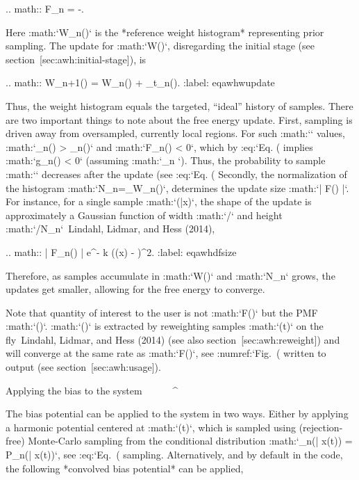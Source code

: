 .. math:: \Delta F_n = -\ln {}.

Here :math:`W_n(\lambda)` is the *reference weight histogram*
representing prior sampling. The update for :math:`W(\lambda)`,
disregarding the initial stage (see section [sec:awh:initial-stage]), is

.. math:: W_{n+1}(\lambda) = W_n(\lambda) + \sum_t\rho_n(\lambda).
          :label: eqawhwupdate

Thus, the weight histogram equals the targeted, “ideal” history of
samples. There are two important things to note about the free energy
update. First, sampling is driven away from oversampled, currently local
regions. For such :math:`\lambda` values,
:math:`\omega_n(\lambda) > \rho_n(\lambda)` and
:math:`\Delta F_n(\lambda) < 0`, which by :eq:`Eq. (%
implies :math:`\Delta g_n(\lambda) < 0` (assuming
:math:`\Delta \rho_n `). Thus, the probability to sample
:math:`\lambda` decreases after the update (see :eq:`Eq. (%
Secondly, the normalization of the histogram
:math:`N_n=\sum_\lambda W_n(\lambda)`, determines the update size
:math:`| \Delta F(\lambda) |`. For instance, for a single sample
:math:`\omega(\lambda|x)`, the shape of the update is approximately a
Gaussian function of width :math:`/` and height
:math:`/N_n` Lindahl, Lidmar, and Hess (2014),

.. math:: | \Delta F_n(\lambda) | \propto {} e^{- \beta k (\xi(x) - \lambda)^2}.
          :label: eqawhdfsize

Therefore, as samples accumulate in :math:`W(\lambda)` and :math:`N_n`
grows, the updates get smaller, allowing for the free energy to
converge.

Note that quantity of interest to the user is not :math:`F(\lambda)` but
the PMF :math:`\Phi(\xi)`. :math:`\Phi(\xi)` is extracted by reweighting
samples :math:`\xi(t)` on the fly Lindahl, Lidmar, and Hess (2014) (see
also section [sec:awh:reweight]) and will converge at the same rate as
:math:`F(\lambda)`, see :numref:`Fig. (%
written to output (see section [sec:awh:usage]).

Applying the bias to the system
^^^^^^^^^^^^^^^^^^^^^^^^^^^^^^^

The bias potential can be applied to the system in two ways. Either by
applying a harmonic potential centered at :math:`\lambda(t)`, which is
sampled using (rejection-free) Monte-Carlo sampling from the conditional
distribution :math:`\omega_n(\lambda | x(t)) = P_n(\lambda | x(t))`, see
:eq:`Eq. (%
sampling. Alternatively, and by default in the code, the following
*convolved bias potential* can be applied,

